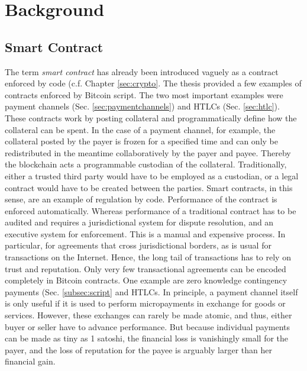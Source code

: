 

\section{Background}


\subsection{Smart Contract}

The term \emph{smart contract} has already been introduced vaguely as a contract enforced by code (c.f. Chapter \ref{sec:crypto}. The thesis provided a few examples of contracts enforced by Bitcoin script. The two most important examples were payment channels (Sec. \ref{sec:paymentchannels}) and \ac{HTLC}s (Sec. \ref{sec:htlc}). These contracts work by posting collateral and programmatically define how the collateral can be spent. In the case of a payment channel, for example, the collateral posted by the payer is frozen for a specified time and can only be redistributed in the meantime collaboratively by the payer and payee. Thereby the blockchain acts a programmable custodian of the collateral. Traditionally, either a trusted third party would have to be employed as a custodian, or a legal contract would have to be created between the parties. Smart contracts, in this sense, are an example of regulation by code. Performance of the contract is enforced automatically. Whereas performance of a traditional contract has to be audited and requires a jurisdictional system for dispute resolution, and an executive system for enforcement. This is a manual and expensive process. In particular, for agreements that cross jurisdictional borders, as is usual for transactions on the Internet. Hence, the long tail of transactions has to rely on trust and reputation. 
Only very few transactional agreements can be encoded completely in Bitcoin contracts. One example are zero knowledge contingency payments (Sec. \ref{subsec:script} and \ac{HTLC}s. In principle, a payment channel itself is only useful if it is used to perform micropayments in exchange for goods or services. However, these exchanges can rarely be made atomic, and thus, either buyer or seller have to advance performance. But because individual payments can be made as tiny as 1 satoshi, the financial loss is vanishingly small for the payer, and the loss of reputation for the payee is arguably larger than her financial gain. 
